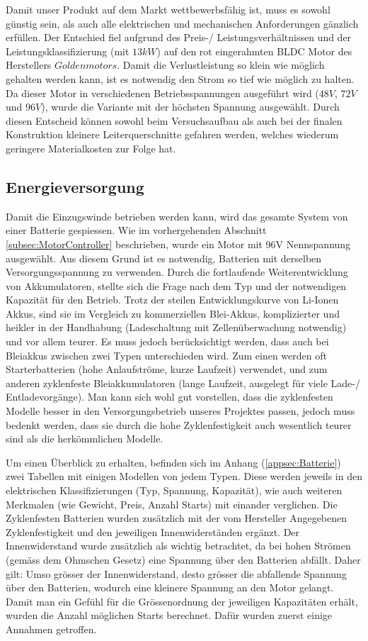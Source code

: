 Damit unser Produkt auf dem Markt wettbewerbsfähig ist, muss es sowohl günstig sein, als auch alle elektrischen und mechanischen Anforderungen gänzlich erfüllen. Der Entschied fiel aufgrund des Preis-/ Leistungsverhältnissen und der Leistungsklassifizierung (mit $ 13kW $) auf den rot eingerahmten BLDC Motor des Herstellers $ Goldenmotors $. Damit die Verlustleistung so klein wie möglich gehalten werden kann, ist es notwendig den Strom so tief wie möglich zu halten. Da dieser Motor in verschiedenen Betriebsspannungen ausgeführt wird ($ 48V $, $ 72V $ und $ 96V $), wurde die Variante mit der höchsten Spannung ausgewählt. Durch diesen Entscheid können sowohl beim Versuchsaufbau als auch bei der finalen Konstruktion kleinere Leiterquerschnitte gefahren werden, welches wiederum geringere Materialkosten zur Folge hat.

\subsection{Energieversorgung}\label{subsec:Energieversorgung}

Damit die Einzugswinde betrieben werden kann, wird das gesamte System von einer Batterie gespiessen. Wie im vorhergehenden Abschnitt \ref{subsec:MotorController} beschrieben, wurde ein Motor mit 96V Nennspannung ausgewählt. Aus diesem Grund ist es notwendig, Batterien mit derselben Versorgungsspannung zu verwenden. Durch die fortlaufende Weiterentwicklung von Akkumulatoren, stellte sich die Frage nach dem Typ und der notwendigen Kapazität für den Betrieb. Trotz der steilen Entwicklungskurve von Li-Ionen Akkus, sind sie im Vergleich zu kommerziellen Blei-Akkus, komplizierter und heikler in der Handhabung (Ladeschaltung mit Zellenüberwachung notwendig) und vor allem teurer. Es muss jedoch berücksichtigt werden, dass auch bei Bleiakkus zwischen zwei Typen unterschieden wird. Zum einen werden oft Starterbatterien (hohe Anlaufströme, kurze Laufzeit) verwendet, und zum anderen zyklenfeste Bleiakkumulatoren (lange Laufzeit, ausgelegt für viele Lade-/ Entladevorgänge). Man kann sich wohl gut vorstellen, dass die zyklenfesten Modelle besser in den Versorgungsbetrieb unseres Projektes passen, jedoch muss bedenkt werden, dass sie durch die hohe Zyklenfestigkeit auch wesentlich teurer sind als die herkömmlichen Modelle.

Um einen Überblick zu erhalten, befinden sich im Anhang (\ref{appsec:Batterie}) zwei Tabellen mit einigen Modellen von jedem Typen. Diese werden jeweils in den elektrischen Klassifizierungen (Typ, Spannung, Kapazität), wie auch weiteren Merkmalen (wie Gewicht, Preis, Anzahl Starts) mit einander verglichen. Die Zyklenfesten Batterien wurden zusätzlich mit der vom Hersteller Angegebenen Zyklenfestigkeit und den jeweiligen Innenwiderständen ergänzt. Der Innenwiderstand wurde zusätzlich als wichtig betrachtet, da bei hohen Strömen (gemäss dem Ohmschen Gesetz) eine Spannung über den Batterien abfällt. Daher gilt: Umso grösser der Innenwiderstand, desto grösser die abfallende Spannung über den Batterien, wodurch eine kleinere Spannung an den Motor gelangt.
Damit man ein Gefühl für die Grössenordnung der jeweiligen Kapazitäten erhält, wurden die Anzahl möglichen Starts berechnet. Dafür wurden zuerst einige Annahmen getroffen.

